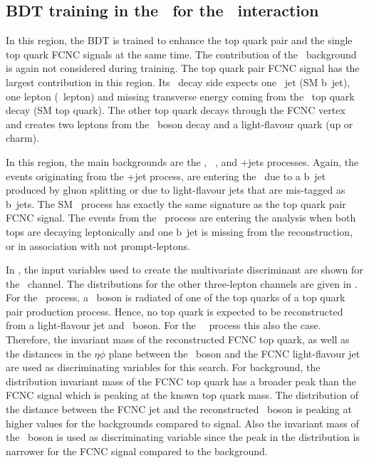 \clearpage
\subsection{BDT training in the \TTSR\ for the \Zut\ interaction}
\label{sec:BDTTTSRZUT}
In this region, the BDT is trained to enhance the top quark pair and the single top quark FCNC signals at the same time. The contribution of the \NPL\ background is again not considered during training. The top quark pair FCNC signal has the largest contribution in this region. Its \SM\ decay side expects one \Pbottom\ jet (SM b~jet), one lepton (\PW\ lepton) and missing transverse energy coming from the \SM\ top quark decay (SM top quark). The other top quark decays through the FCNC vertex and creates two leptons from the \PZ\ boson decay and a light-flavour quark (up or charm). 

In this region, the main backgrounds are the \ttZ, \SM\ \tZq, and \WZ+jets processes. Again, the events originating from the \WZ+jet process, are entering the \STSR\ due to a b~jet produced by gluon splitting or due to light-flavour jets that are mis-tagged as b~jets.  The SM \tZq\ process has exactly the same signature as the top quark pair FCNC signal.  The events from the \ttZ\ process are entering the analysis when both tops are decaying leptonically and one b~jet is missing from the reconstruction, or in association with not prompt-leptons. 


  In , the input variables used to create the multivariate discriminant are shown for the \mumumu\ channel. The distributions for the other three-lepton channels are given in . For the \ttZ\ process, a \PZ\ boson is radiated of one of the top quarks of a top quark pair production process. Hence, no top quark is expected to be reconstructed from a light-flavour jet and \PZ\ boson. For the \SM\ \tZq\ process this also the case. Therefore, the invariant mass of the reconstructed FCNC top quark, as well as the distances in the $\eta\phi$ plane between the \PZ\ boson and the FCNC light-flavour jet are used as discriminating variables for this search. For background, the distribution invariant mass of the FCNC top quark has a broader peak than the FCNC signal which is peaking at the known top quark mass. The distribution of the distance between the FCNC jet and the reconstructed \PZ\ boson is peaking at higher values for the backgrounds compared to signal. Also the invariant mass of the \PZ\ boson is used as discriminating variable since  the peak in the distribution is  narrower for the FCNC signal compared to the background. 
  

